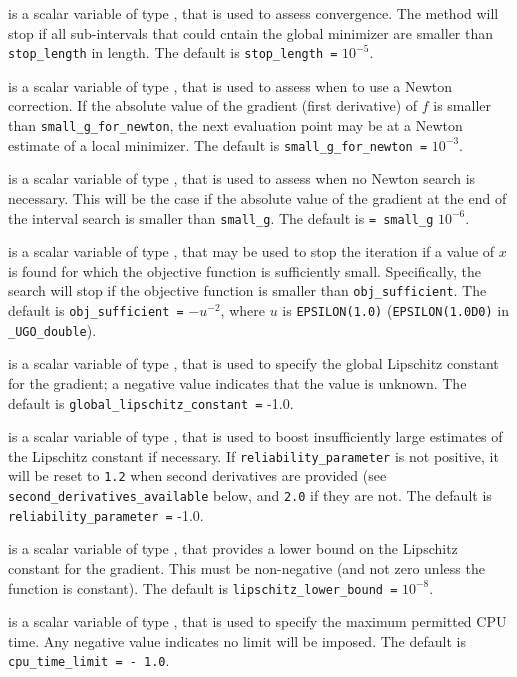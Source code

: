 \documentclass{galahad}
\newcommand{\packagename}{UGO}
\newcommand{\fullpackagename}{\libraryname\_\packagename}
\begin{document}
\begin{description}
 is a scalar variable of type \realdp, that is used to
assess convergence. The method will stop if all sub-intervals that could
cntain the global minimizer are smaller than {\tt stop\_length} in length.
The default is {\tt stop\_length =} $10^{-5}$.

 is a scalar variable of type \realdp,
that is used to assess when to use a Newton correction. If the absolute value
of the gradient (first derivative) of $f$ is smaller than
{\tt small\_g\_for\_newton}, the next evaluation point may be at a
Newton estimate of a local minimizer.
The default is {\tt small\_g\_for\_newton =} $10^{-3}$.

 is a scalar variable of type \realdp, that is used to
assess when no Newton search is necessary. This will be the case if
the absolute value of the gradient at the end of the interval search is
smaller than {\tt small\_g}.
The default is {\tt = small\_g} $10^{-6}$.

 is a scalar variable of type \realdp,
that may be used to stop the iteration if a value of $x$ is found for which
the objective function is sufficiently small. Specifically, the search
will stop if the objective function is smaller than {\tt obj\_sufficient}.
The default is {\tt obj\_sufficient =} $-u^{-2}$,
where $u$ is {\tt EPSILON(1.0)} ({\tt EPSILON(1.0D0)} in
{\tt \fullpackagename\_double}).

 is a scalar variable of type \realdp,
that is used to specify the global Lipschitz constant for the gradient;
a negative value indicates that the value is unknown.
The default is {\tt global\_lipschitz\_constant =} -1.0.

 is a scalar variable of type \realdp,
that is used to boost insufficiently large estimates of the Lipschitz constant
if necessary. If {\tt reliability\_parameter} is not positive, it will be
reset to {\tt 1.2} when second derivatives are provided
(see {\tt second\_derivatives\_available} below, and {\tt 2.0} if they
are not.
The default is {\tt reliability\_parameter =} -1.0.

 is a scalar variable of type \realdp,
that provides a lower bound on the Lipschitz constant for the gradient.
This must be non-negative (and not zero unless the function is constant).
The default is {\tt lipschitz\_lower\_bound =} $10^{-8}$.

 is a scalar variable of type \realdp,
that is used to specify the maximum permitted CPU time. Any negative
value indicates no limit will be imposed. The default is
{\tt cpu\_time\_limit = - 1.0}.


\end{description}
\end{document}
